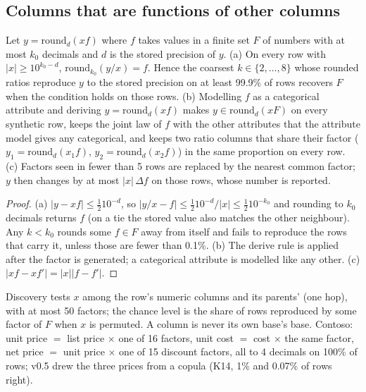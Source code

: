 \subsection{Columns that are functions of other columns}
\begin{proposition}\label{prop:ratio}
Let $y=\mathrm{round}_d(x f)$ where $f$ takes values in a finite set $F$ of numbers with at most $k_0$ decimals and $d$ is the stored precision of $y$. (a) On every row with $|x|\ge 10^{k_0-d}$, $\mathrm{round}_{k_0}(y/x)=f$. Hence the coarsest $k\in\{2,\dots,8\}$ whose rounded ratios reproduce $y$ to the stored precision on at least 99.9\% of rows recovers $F$ when the condition holds on those rows. (b) Modelling $f$ as a categorical attribute and deriving $y=\mathrm{round}_d(xf)$ makes $y\in\mathrm{round}_d(xF)$ on every synthetic row, keeps the joint law of $f$ with the other attributes that the attribute model gives any categorical, and keeps two ratio columns that share their factor ($y_1=\mathrm{round}_d(x_1f)$, $y_2=\mathrm{round}_d(x_2f)$) in the same proportion on every row. (c) Factors seen in fewer than 5 rows are replaced by the nearest common factor; $y$ then changes by at most $|x|\,\Delta f$ on those rows, whose number is reported.
\end{proposition}
\begin{proof}
(a) $|y-xf|\le\frac12 10^{-d}$, so $|y/x-f|\le\frac12 10^{-d}/|x|\le\frac12 10^{-k_0}$ and rounding to $k_0$ decimals returns $f$ (on a tie the stored value also matches the other neighbour). Any $k<k_0$ rounds some $f\in F$ away from itself and fails to reproduce the rows that carry it, unless those are fewer than 0.1\%. (b) The derive rule is applied after the factor is generated; a categorical attribute is modelled like any other. (c) $|x f-x f'|=|x||f-f'|$.
\end{proof}
\noindent Discovery tests $x$ among the row's numeric columns and its parents' (one hop), with at most 50 factors; the chance level is the share of rows reproduced by some factor of $F$ when $x$ is permuted. A column is never its own base's base. Contoso: unit price $=$ list price $\times$ one of 16 factors, unit cost $=$ cost $\times$ the same factor, net price $=$ unit price $\times$ one of 15 discount factors, all to 4 decimals on 100\% of rows; v0.5 drew the three prices from a copula (K14, 1\% and 0.07\% of rows right).

